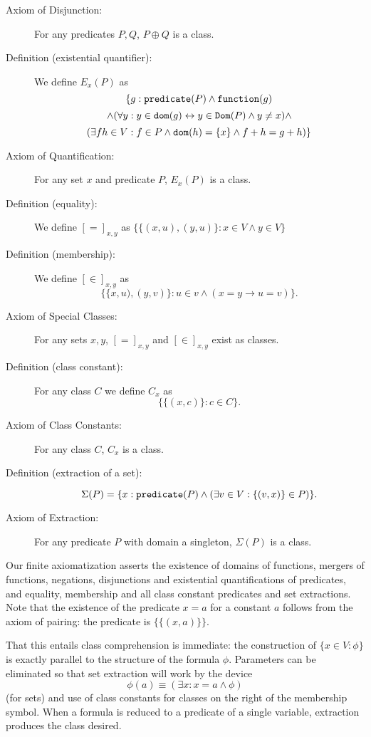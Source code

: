 \documentclass[12pt]{article}
\begin{document}
\begin{description}
\item[Axiom of Disjunction:]  For any predicates $P,Q$, $P \oplus Q$ is a class.

\item[Definition (existential quantifier):]  We define $E_x(P)$ as $$\{g:{\tt predicate}(P) \wedge {\tt function}(g) $$ $$ \wedge (\forall y:y \in {\tt dom}(g) \leftrightarrow y \in {\tt Dom}(P) \wedge y \neq x) \wedge$$ $$ (\exists fh\in V:f \in P \wedge {\tt dom}(h) = \{x\} \wedge f+h = g+h)\}$$

\item[Axiom of Quantification:]  For any set $x$ and predicate $P$, $E_x(P)$ is a class.

\item[Definition (equality):] We define $[=]_{x,y}$ as $\{\{(x,u),(y,u)\}:x \in V \wedge y \in V\}$

\item[Definition (membership):]  We define $[\in]_{x,y}$ as $$\{\{x,u),(y,v)\}:u \in v \wedge (x=y \rightarrow u=v)\}.$$

\item[Axiom of Special Classes:]  For any sets $x,y$, $[=]_{x,y}$  and $[\in]_{x,y}$ exist as classes.

\item[Definition (class constant):]  For any class $C$ we define $C_x$ as $$\{\{(x,c)\}:c \in C\}.$$

\item[Axiom of Class Constants:]  For any class $C$, $C_x$ is a class.

\item[Definition (extraction of a set):]  $$\Sigma(P) = \{x:{\tt predicate}(P) \wedge (\exists v\in V:\{(v,x)\} \in P)\}.$$

\item[Axiom of Extraction:]  For any predicate $P$ with domain a singleton, $\Sigma(P)$ is a class.

\end{description}

Our finite axiomatization asserts the existence of domains of functions, mergers of functions, negations, disjunctions and existential quantifications of predicates, and equality, membership and all class constant predicates and set extractions.  Note that the existence of the predicate $x=a$ for a constant $a$ follows from the axiom of pairing:  the predicate is $\{\{(x,a)\}\}$.   

That this entails class comprehension is immediate:  the construction of $\{x \in V:\phi\}$ is exactly parallel to the structure of the formula $\phi$.
Parameters can be eliminated so that set extraction will work by the device $$\phi(a) \equiv (\exists x:x=a \wedge \phi)$$ (for sets) and use of
class constants for classes on the right of the membership symbol.  When a formula is reduced to a predicate of a single variable, extraction produces the class desired.
\end{document}
